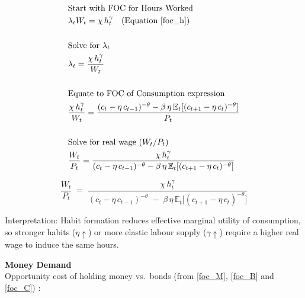 \documentclass[11pt,preprint]{elsarticle}
\numberwithin{equation}{section}
\numberwithin{figure}{section}
\numberwithin{table}{section}
\begin{document}
\begin{align*}
& \text{Start with FOC for Hours Worked} \\
& \lambda_t W_t = \chi\,h_t^{\gamma} \quad \text{(Equation \ref{foc_h})} \\
& \\
& \text{Solve for } \lambda_t \\
& \lambda_t = \frac{\chi\,h_t^{\gamma}}{W_t} \\
& \\
& \text{Equate to FOC of Consumption expression} \\
& \frac{\chi\,h_t^{\gamma}}{W_t} = \frac{(c_t - \eta\,c_{t-1})^{-\theta} - \beta\,\eta\,\mathbb{E}_t[(c_{t+1} - \eta\,c_t)^{-\theta}]}{P_t} \\
& \\
& \text{Solve for real wage } (W_t/P_t) \\
& \frac{W_t}{P_t} = \frac{\chi\,h_t^{\gamma}}{(c_t - \eta\,c_{t-1})^{-\theta} - \beta\,\eta\,\mathbb{E}_t[(c_{t+1} - \eta\,c_t)^{-\theta}]}
\end{align*}

\begin{equation}\label{labourSupply_app}
\boxed{
  \frac{W_t}{P_t}
  \;=\;
  \frac{\chi\,h_t^{\gamma}}
       {(c_t - \eta\,c_{t-1})^{-\theta}
        \;-\;
        \beta\,\eta\,\mathbb{E}_t\!\bigl[(c_{t+1} - \eta\,c_t)^{-\theta}\bigr]}
}
\end{equation}

Interpretation: Habit formation reduces effective marginal utility of
consumption, so stronger habits (\(\eta\uparrow\)) or more elastic
labour supply (\(\gamma\uparrow\)) require a higher real wage to induce
the same hours.

\textbf{Money Demand}\\
Opportunity cost of holding money vs.~bonds (from \eqref{foc_M},
\eqref{foc_B} and \eqref{foc_C}) :
\end{document}
